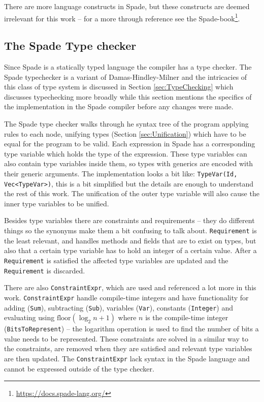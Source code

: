There are more language constructs in Spade, but these constructs are deemed irrelevant for this work -- for a more through reference see the Spade-book\footnote{\url{https://docs.spade-lang.org/}}.

\subsection{The Spade Type checker}
\label{sec:TheSpadeTypeChecker}
Since Spade is a statically typed language the compiler has a type checker. The Spade typechecker is a variant of Damas-Hindley-Milner and the intricacies of this class of type system is discussed in Section \ref{sec:TypeChecking} which discusses typechecking more broadly while this section mentions the specifics of the implementation in the Spade compiler before any changes were made.

The Spade type checker walks through he syntax tree of the program applying rules to each node, unifying types (Section \ref{sec:Unification}) which have to be equal for the program to be valid. Each expression in Spade has a corresponding type variable which holds the type of the expression. These type variables can also contain type variables inside them, so types with generics are encoded with their generic arguments. The implementation looks a bit like: \verb+TypeVar(Id, Vec<TypeVar>)+, this is a bit simplified but the details are enough to understand the rest of this work. The unification of the outer type variable will also cause the inner type variables to be unified.

Besides type variables there are constraints and requirements -- they do different things so the synonyms make them a bit confusing to talk about. \verb+Requirement+ is the least relevant, and handles methods and fields that are  to exist on types, but also that a certain type variable has to hold an integer of a certain value. After a \verb+Requirement+ is satisfied the affected type variables are updated and the \verb+Requirement+ is discarded.

There are also \verb+ConstraintExpr+, which are used and referenced a lot more in this work. \verb+ConstraintExpr+ handle compile-time integers and have functionality for adding (\verb+Sum+), subtracting (\verb+Sub+), variables (\verb+Var+), constants (\verb+Integer+) and evaluating using $\text{floor}(\log_2{n} + 1)$ where $n$ is the compile-time integer (\verb+BitsToRepresent+) -- the logarithm operation is used to find the number of bits a value needs to be represented. These constraints are solved in a similar way to the constraints, are removed when they are satisfied and relevant type variables are then updated. The \verb+ConstraintExpr+ lack syntax in the Spade language and cannot be expressed outside of the type checker.

